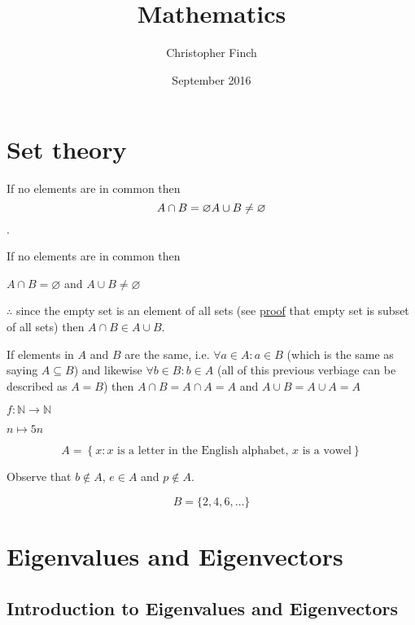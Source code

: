 \documentclass[openany]{scrbook}
\title{Mathematics}
\author{Christopher Finch}
\date{September 2016}
\newcommand{\filler}{\blindtext[1]}
\begin{document}
\maketitle

\filler


\chapter{Set theory}

If no elements are in common then  
\begin{equation*}
A \cap B = \varnothing \\
A \cup B \neq \varnothing
\end{equation*}.

If no elements are in common then
\begin{center}
$ A \cap B = \varnothing $ and $ A \cup B \neq \varnothing $
\end{center}

$\therefore$ since the empty set is an element of all sets (see \href{https://proofwiki.org/wiki/Empty_Set_is_Subset_of_All_Sets}{proof} that empty set is subset of all sets) then $ A\cap B \in A \cup B $.

If elements in $A$ and $B$ are the same, i.e. $ \forall a \in A : a \in B $ (which is the same as saying $A \subseteq B$) and likewise $ \forall b \in B : b \in A $ (all of this previous verbiage can be described as $A = B$) then $A \cap B = A\cap A = A $ and $A\cup B = A\cup A = A$


$ f:\mathbb N\to\mathbb N $

$n\mapsto5n$

\[A=\left\{x:x \text{ is a letter in the English alphabet, }x \text{ is a vowel} \right\}\]

Observe that $b \notin A$, $e \in A$ and $p \notin A$.

\[B=\{2,4,6,\dots \}\]




\chapter{Eigenvalues and Eigenvectors}
\section{Introduction to Eigenvalues and Eigenvectors}

\filler
\end{document}
